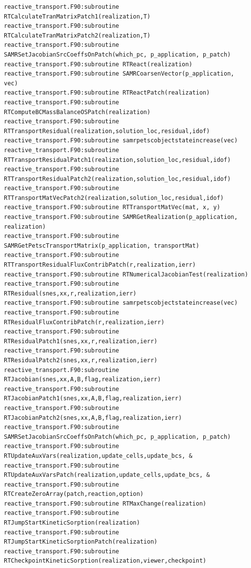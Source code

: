 \documentclass[12pt]{article}
\begin{document}
\begin{verbatim}
reactive_transport.F90:subroutine RTCalculateTranMatrixPatch1(realization,T)
reactive_transport.F90:subroutine RTCalculateTranMatrixPatch2(realization,T)
reactive_transport.F90:subroutine SAMRSetJacobianSrcCoeffsOnPatch(which_pc, p_application, p_patch) 
reactive_transport.F90:subroutine RTReact(realization)
reactive_transport.F90:subroutine SAMRCoarsenVector(p_application, vec)
reactive_transport.F90:subroutine RTReactPatch(realization)
reactive_transport.F90:subroutine RTComputeBCMassBalanceOSPatch(realization)
reactive_transport.F90:subroutine RTTransportResidual(realization,solution_loc,residual,idof)
reactive_transport.F90:subroutine samrpetscobjectstateincrease(vec)
reactive_transport.F90:subroutine RTTransportResidualPatch1(realization,solution_loc,residual,idof)
reactive_transport.F90:subroutine RTTransportResidualPatch2(realization,solution_loc,residual,idof)
reactive_transport.F90:subroutine RTTransportMatVecPatch2(realization,solution_loc,residual,idof)
reactive_transport.F90:subroutine RTTransportMatVec(mat, x, y)
reactive_transport.F90:subroutine SAMRGetRealization(p_application, realization) 
reactive_transport.F90:subroutine SAMRGetPetscTransportMatrix(p_application, transportMat) 
reactive_transport.F90:subroutine RTTransportResidualFluxContribPatch(r,realization,ierr)
reactive_transport.F90:subroutine RTNumericalJacobianTest(realization)
reactive_transport.F90:subroutine RTResidual(snes,xx,r,realization,ierr)
reactive_transport.F90:subroutine samrpetscobjectstateincrease(vec)
reactive_transport.F90:subroutine RTResidualFluxContribPatch(r,realization,ierr)
reactive_transport.F90:subroutine RTResidualPatch1(snes,xx,r,realization,ierr)
reactive_transport.F90:subroutine RTResidualPatch2(snes,xx,r,realization,ierr)
reactive_transport.F90:subroutine RTJacobian(snes,xx,A,B,flag,realization,ierr)
reactive_transport.F90:subroutine RTJacobianPatch1(snes,xx,A,B,flag,realization,ierr)
reactive_transport.F90:subroutine RTJacobianPatch2(snes,xx,A,B,flag,realization,ierr)
reactive_transport.F90:subroutine SAMRSetJacobianSrcCoeffsOnPatch(which_pc, p_application, p_patch) 
reactive_transport.F90:subroutine RTUpdateAuxVars(realization,update_cells,update_bcs, &
reactive_transport.F90:subroutine RTUpdateAuxVarsPatch(realization,update_cells,update_bcs, &
reactive_transport.F90:subroutine RTCreateZeroArray(patch,reaction,option)
reactive_transport.F90:subroutine RTMaxChange(realization)
reactive_transport.F90:subroutine RTJumpStartKineticSorption(realization)
reactive_transport.F90:subroutine RTJumpStartKineticSorptionPatch(realization)
reactive_transport.F90:subroutine RTCheckpointKineticSorption(realization,viewer,checkpoint)

\end{verbatim}
\end{document}

